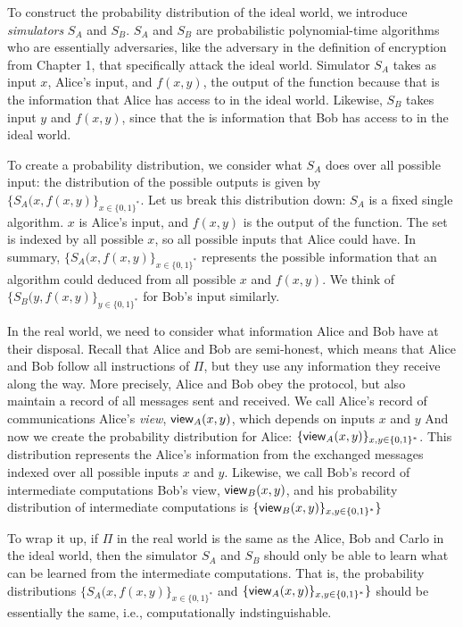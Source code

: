 To construct the probability distribution of the ideal world, we introduce \textit{simulators} $S_A$ and $S_B$.
$S_A$ and $S_B$ are probabilistic polynomial-time algorithms who are essentially adversaries, like the adversary in the definition of encryption from Chapter 1, that specifically attack the ideal world.
Simulator $S_A$ takes as input $x$, Alice's input, and $f(x,y)$, the output of the function because that is the information that Alice has access to in the ideal world.
Likewise, $S_B$ takes input $y$ and $f(x,y)$, since that the is information that Bob has access to in the ideal world.

To create a probability distribution, we consider what $S_A$ does over all possible input: the distribution of the possible outputs is given by $\{S_A(x, f(x,y)\}_{x \in \{0,1\}^*}$.
Let us break this distribution down: $S_A$ is a fixed single algorithm.
$x$ is Alice's input, and $f(x,y)$ is the output of the function.
The set is indexed by all possible $x$, so all possible inputs that Alice could have.
In summary, $\{S_A(x, f(x,y)\}_{x \in \{0,1\}^*}$ represents the possible information that an algorithm could deduced from all possible $x$ and $f(x,y)$.
We think of $\{S_B(y, f(x,y)\}_{y \in \{0,1\}^*}$ for Bob's input similarly.

In the real world, we need to consider what information Alice and Bob have at their disposal.
Recall that Alice and Bob are semi-honest, which means that Alice and Bob follow all instructions of $\Pi$, but they use any information they receive along the way.
More precisely, Alice and Bob obey the protocol, but also maintain a record of all messages sent and received.
We call Alice's record of communications Alice's \textit{view}, ${\sf view}_A(x, y)$, which depends on inputs $x$ and $y$
And now we create the probability distribution for Alice: $\{{\sf view}_A(x, y)\}_{x, y \in \{0,1\}^*}$.
This distribution represents the Alice's information from the exchanged messages indexed over all possible inputs $x$ and $y$.
Likewise, we call Bob's record of intermediate computations Bob's view,  ${\sf view}_B(x, y)$, and his probability distribution of intermediate computations is $\{{\sf view}_B(x, y)\}_{x,y \in \{0,1\}^*}\}$

To wrap it up, if $\Pi$ in the real world is the same as the Alice, Bob and Carlo in the ideal world, then the simulator $S_A$ and $S_B$ should only be able to learn what can be learned from the intermediate computations. 
That is, the probability distributions $\{S_A(x, f(x,y)\}_{x \in \{0,1\}^*}$ and $\{{\sf view}_A(x, y)\}_{x, y \in \{0,1\}^*}\}$ should be essentially the same, i.e., computationally indstinguishable.

